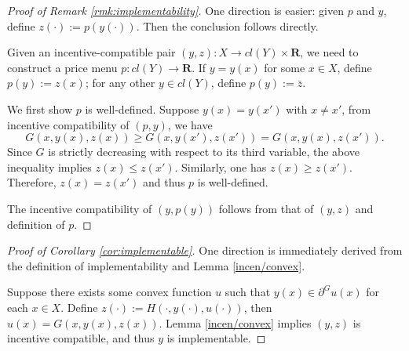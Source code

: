 \documentclass[a4paper, 11pt]{amsart}
\numberwithin{equation}{section}
\theoremstyle{plain}
\theoremstyle{definition}
\theoremstyle{remark}
\newcommand{\R}{\mathbf{R}}
\begin{document}
\begin{proof}[Proof of Remark \ref{rmk:implementability}]
	One direction is easier: given $p$ and $y$, define $z(\cdot):= p(y(\cdot))$. Then the conclusion follows directly. \medskip
	
	Given an incentive-compatible pair $(y, z): X \rightarrow cl(Y) \times \R$, we need to construct a price menu $p: cl(Y)\rightarrow \R$. If $y= y(x)$ for some $x\in X$, define $p(y):= z(x)$; for any other $y \in cl(Y)$, define $p(y) := \bar{z}$. \medskip
	
	We first show $p$ is well-defined. Suppose $y(x) = y(x')$ with $x\ne x'$, from incentive compatibility of $(p,y)$, we have 
	$$G(x,y(x), z(x)) \ge G(x, y(x'), z(x')) = G(x, y(x), z(x')).$$ Since $G$ is strictly decreasing with respect to its third variable, the above inequality implies $z(x) \le z(x')$. Similarly, one has $z(x) \ge z(x')$. Therefore, $z(x) = z(x')$ and thus $p$ is well-defined. \medskip
	
	The incentive compatibility of $(y, p(y))$ follows from that of $(y, z)$ and definition of $p$.
\end{proof}
\vspace{0.3cm}
\begin{proof}[Proof of Corollary \ref{cor:implementable}]
	One direction is immediately derived from the definition of implementability and Lemma \ref{incen/convex}.\medskip
	
	Suppose there exists some convex function $u$ such that $y(x) \in \partial^G u(x)$ for each $x \in X$. Define $z(\cdot):= H(\cdot, y(\cdot), u(\cdot))$, then $u(x) = G(x, y(x), z(x))$.
	Lemma \ref{incen/convex} implies $(y, z)$ is incentive compatible, and thus $y$ is implementable.
\end{proof}
\vspace{0.3cm}
\end{document}

